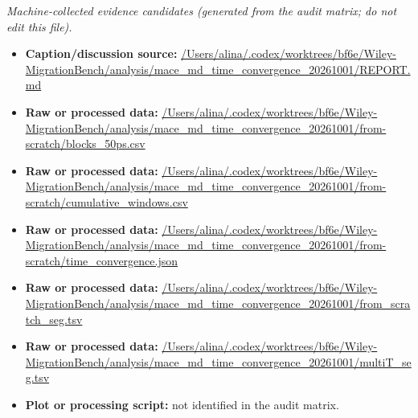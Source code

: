 \emph{Machine-collected evidence candidates (generated from the audit matrix; do not edit this file).}
\begin{itemize}[leftmargin=1.4em,noitemsep]
\item \textbf{Caption/discussion source:} \url{/Users/alina/.codex/worktrees/bf6e/Wiley-MigrationBench/analysis/mace_md_time_convergence_20261001/REPORT.md}
\item \textbf{Raw or processed data:} \url{/Users/alina/.codex/worktrees/bf6e/Wiley-MigrationBench/analysis/mace_md_time_convergence_20261001/from-scratch/blocks_50ps.csv}
\item \textbf{Raw or processed data:} \url{/Users/alina/.codex/worktrees/bf6e/Wiley-MigrationBench/analysis/mace_md_time_convergence_20261001/from-scratch/cumulative_windows.csv}
\item \textbf{Raw or processed data:} \url{/Users/alina/.codex/worktrees/bf6e/Wiley-MigrationBench/analysis/mace_md_time_convergence_20261001/from-scratch/time_convergence.json}
\item \textbf{Raw or processed data:} \url{/Users/alina/.codex/worktrees/bf6e/Wiley-MigrationBench/analysis/mace_md_time_convergence_20261001/from_scratch_seg.tsv}
\item \textbf{Raw or processed data:} \url{/Users/alina/.codex/worktrees/bf6e/Wiley-MigrationBench/analysis/mace_md_time_convergence_20261001/multiT_seg.tsv}
\item \textbf{Plot or processing script:} not identified in the audit matrix.
\end{itemize}
